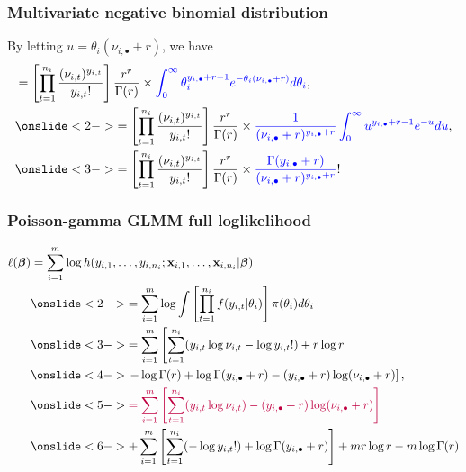 \documentclass[ignorenonframetext,]{beamer}
\begin{document}
\begin{frame}
\frametitle{Multivariate negative binomial distribution}

By letting $u = \theta_i(\nu_{i,\bullet} + r)$, we have
\begin{align*}
&= \left[ \prod_{t=1}^{n_i} \frac{(\nu_{i,t})^{y_{i,t}}}{y_{i,t}!} \right] \frac{r^r}{\Gamma(r)} \times {\color{blue}\int_0^\infty \theta_i^{y_{i,\bullet} + r - 1} e^{-\theta_i (\nu_{i,\bullet} + r)} d\theta_i}, \\
& \onslide<2->{= \left[ \prod_{t=1}^{n_i} \frac{(\nu_{i,t})^{y_{i,t}}}{y_{i,t}!} \right] \frac{r^r}{\Gamma(r)} \times {\color{blue}\frac{1}{(\nu_{i,\bullet} + r)^{y_{i,\bullet}+r}} \int_0^\infty u^{y_{i,\bullet} + r - 1} e^{-u} du},} \\
& \onslide<3->{= \left[ \prod_{t=1}^{n_i} \frac{(\nu_{i,t})^{y_{i,t}}}{y_{i,t}!} \right] \frac{r^r}{\Gamma(r)} \times {\color{blue}\frac{\Gamma(y_{i,\bullet}+r)}{(\nu_{i,\bullet} + r)^{y_{i,\bullet}+r}}}!}
\end{align*}


\end{frame}

\begin{frame}[t]
\frametitle{Poisson-gamma GLMM full loglikelihood}
\footnotesize

\vspace{-8pt}
\setlength{\jot}{1pt}
\begin{align*}
\ell(\bm{\beta}) &= \sum_{i=1}^m \log h(y_{i,1}, \ldots, y_{i,n_i}; \mathbf{x}_{i,1}, \ldots, \mathbf{x}_{i,n_i} | \bm{\beta}) \\
& \onslide<2->{= \sum_{i=1}^m \log \int \left[ \prod_{t=1}^{n_i} f(y_{i,t}|\theta_i) \right] \pi(\theta_i) d\theta_i} \\
& \onslide<3->{= \sum_{i=1}^m \left[ \sum_{t=1}^{n_i} (y_{i,t} \log \nu_{i,t} - \log y_{i,t}!) + r \log r \right.} \\
& \onslide<4->{\left. - \log \Gamma(r) + \log \Gamma(y_{i,\bullet}+r) - (y_{i,\bullet}+r)\log(\nu_{i,\bullet}+r) \right],} \\
& \onslide<5->{{\color{purple} = \sum_{i=1}^m \left[ \sum_{t=1}^{n_i} (y_{i,t} \log \nu_{i,t}) - (y_{i,\bullet}+r)\log(\nu_{i,\bullet}+r) \right]}} \\
& \onslide<6->{+ \sum_{i=1}^m \left[ \sum_{t=1}^{n_i} (-\log y_{i,t}!) + \log \Gamma(y_{i,\bullet}+r) \right] + mr\log r - m \log \Gamma(r)}
\end{align*}


\end{frame}
\end{document}
